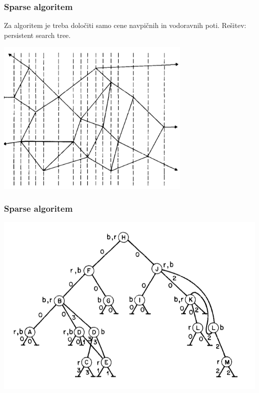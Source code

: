 \documentclass{beamer}
\begin{document}
\begin{frame}
    \frametitle{Sparse algoritem}

    Za algoritem je treba določiti samo cene navpičnih in vodoravnih poti. Rešitev: persistent search tree.

    \includegraphics[width=0.7\textwidth]{slabs.png}
    
\end{frame}

\begin{frame}
    \frametitle{Sparse algoritem}

    \includegraphics[width=1\textwidth]{psTree.png}

\end{frame}
\end{document}
